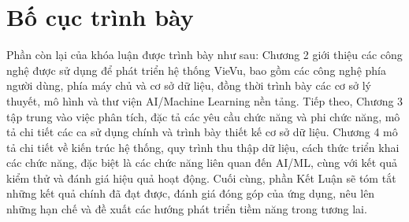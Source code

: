 \section{Bố cục trình bày}
Phần còn lại của khóa luận được trình bày như sau: Chương 2 giới thiệu các công nghệ được sử dụng để phát triển hệ thống VieVu, bao gồm các công nghệ phía người dùng, phía máy chủ và cơ sở dữ liệu, đồng thời trình bày các cơ sở lý thuyết, mô hình và thư viện AI/Machine Learning nền tảng. Tiếp theo, Chương 3 tập trung vào việc phân tích, đặc tả các yêu cầu chức năng và phi chức năng, mô tả chi tiết các ca sử dụng chính và trình bày thiết kế cơ sở dữ liệu. Chương 4 mô tả chi tiết về kiến trúc hệ thống, quy trình thu thập dữ liệu, cách thức triển khai các chức năng, đặc biệt là các chức năng liên quan đến AI/ML, cùng với kết quả kiểm thử và đánh giá hiệu quả hoạt động. Cuối cùng, phần Kết Luận sẽ tóm tắt những kết quả chính đã đạt được, đánh giá đóng góp của ứng dụng, nêu lên những hạn chế và đề xuất các hướng phát triển tiềm năng trong tương lai.